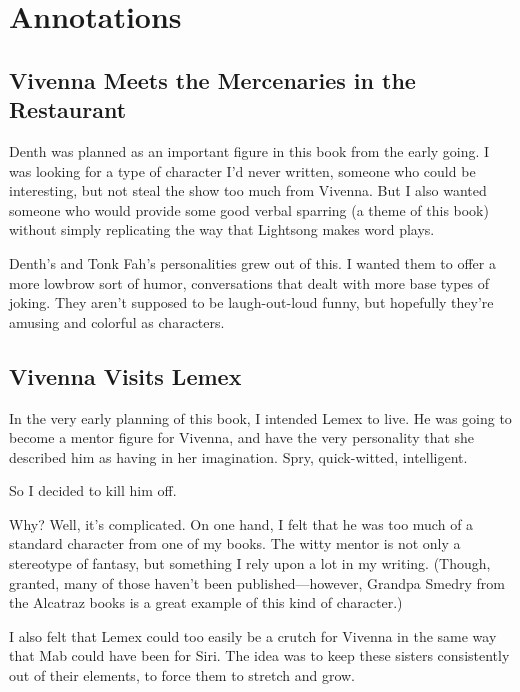 \section*{Annotations}

\subsection*{Vivenna Meets the Mercenaries in the Restaurant}

Denth was planned as an important figure in this book from the early going. I was looking for a type of character I’d never written, someone who could be interesting, but not steal the show too much from Vivenna. But I also wanted someone who would provide some good verbal sparring (a theme of this book) without simply replicating the way that Lightsong makes word plays.

Denth’s and Tonk Fah’s personalities grew out of this. I wanted them to offer a more lowbrow sort of humor, conversations that dealt with more base types of joking. They aren’t supposed to be laugh-out-loud funny, but hopefully they’re amusing and colorful as characters.

\subsection*{Vivenna Visits Lemex}

In the very early planning of this book, I intended Lemex to live. He was going to become a mentor figure for Vivenna, and have the very personality that she described him as having in her imagination. Spry, quick-witted, intelligent.

So I decided to kill him off.

Why? Well, it’s complicated. On one hand, I felt that he was too much of a standard character from one of my books. The witty mentor is not only a stereotype of fantasy, but something I rely upon a lot in my writing. (Though, granted, many of those haven’t been published—however, Grandpa Smedry from the Alcatraz books is a great example of this kind of character.)

I also felt that Lemex could too easily be a crutch for Vivenna in the same way that Mab could have been for Siri. The idea was to keep these sisters consistently out of their elements, to force them to stretch and grow.

